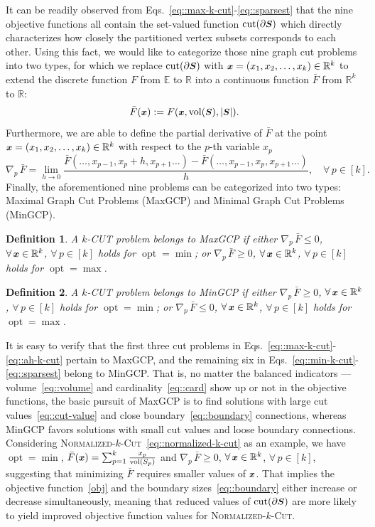 \documentclass[12pt, a4paper]{article}%
\DeclareMathOperator*{\opt}{\ensuremath{opt}}
\renewcommand{\vec}[1]{\mbox{\boldmath \small $#1$}}
\newcommand{\cut}{\mathrm{cut}}
\newcommand{\vol}{\mathrm{vol}}
\numberwithin{equation}{section}
\theoremstyle{plain}
\newtheorem{defn}{Definition}
\begin{document}
	It can be readily observed from Eqs.~\eqref{eq::max-k-cut}-\eqref{eq::sparsest} that the nine objective functions all contain the set-valued function $\cut(\partial \vec S)$ which directly characterizes how closely the partitioned vertex subsets corresponds to each other. Using this fact, we would like to 
	categorize those nine graph cut problems into two types, for which we replace $\cut(\partial\vec S)$ with $\vec x=(x_1,x_2,\ldots,x_k)\in\mathbb{R}^k$ to extend the discrete function $F$ from $\mathbb{E}$ to $\mathbb{R}$ into a continuous function $\bar{F}$ from $\mathbb{R}^k$ to $\mathbb{R}$:
	\[
	\bar{F}(\vec x): =F(\vec x,\vol(\vec S),|\vec S|).
	\]
	Furthermore, we are able to define the partial derivative of $\bar{F}$ at the point $\vec x=(x_1,x_2,\ldots,x_k)\in\mathbb{R}^k$ with respect to the $p$-th variable $x_p$
	\begin{equation}
		\label{derivate:g}\nabla_p\, \bar{F}=\lim\limits_{h\rightarrow 0}\frac{\bar{F}(\ldots,x_{p-1},x_p+h,x_{p+1}\ldots)-\bar{F}(\ldots,x_{p-1},x_p,x_{p+1}\ldots)}{h},\quad \forall\,p\in [k].
	\end{equation}
	Finally,  the aforementioned nine problems can be categorized into two types: Maximal Graph Cut Problems (MaxGCP) and Minimal Graph Cut Problems (MinGCP). 
	\begin{defn}
		\label{def:maxgcp}
		A $k$-CUT problem belongs to MaxGCP if either $\nabla_p\, \bar{F}\leq 0$, $\forall\,\vec x\in\mathbb{R}^k$, $\forall\,p\in[k]$ holds for $\opt=\min$; or $\nabla_p\, \bar{F}\geq 0$, $\forall\,\vec x\in\mathbb{R}^k$, $\forall\,p\in[k]$ holds for $\opt=\max$.
	\end{defn}
	\begin{defn}
		\label{def:mingcp}
		A $k$-CUT problem belongs to MinGCP if either $\nabla_p\, \bar{F}\geq 0$, $\forall\,\vec x\in\mathbb{R}^k$, $\forall\,p\in[k]$ holds for $\opt=\min$; or $\nabla_p\, \bar{F}\leq 0$, $\forall\,\vec x\in\mathbb{R}^k$, $\forall\,p\in[k]$ holds for $\opt=\max$.
	\end{defn}		
	It is easy to verify that the first three cut problems in Eqs.~\eqref{eq::max-k-cut}-\eqref{eq::ah-k-cut} pertain to MaxGCP, and the remaining six in Eqs.~\eqref{eq::min-k-cut}-\eqref{eq::sparsest} belong to MinGCP. That is, no matter the balanced indicators --- volume~\eqref{eq::volume} and cardinality~\eqref{eq::card} show up or not in the objective functions, the basic pursuit of MaxGCP is to find solutions with large cut values~\eqref{eq::cut-value} and close boundary~\eqref{eq::boundary} connections, whereas MinGCP favors solutions with small cut values and loose boundary connections. Considering \textsc{Normalized}-$k$-\textsc{Cut}~\eqref{eq::normalized-k-cut} as an example, we have $\opt=\min$, $\bar{F}(\vec x)=\sum_{p=1}^k\frac{x_p}{\vol(S_p)}$ and $\nabla_p\, \bar{F}\geq 0$, $\forall\,\vec x\in\mathbb{R}^k$, $\forall\,p\in[k]$, suggesting that minimizing $\bar{F}$ requires smaller values of $\vec x$. That implies the objective function~\eqref{obj} and the boundary sizes~\eqref{eq::boundary} either increase or decrease simultaneously, meaning that reduced values of $\cut(\partial\vec S)$ are more likely to yield improved objective function values for \textsc{Normalized}-$k$-\textsc{Cut}.
\end{document}
